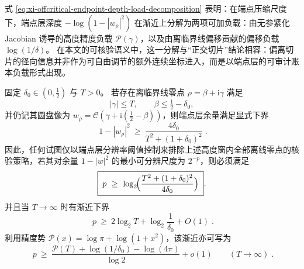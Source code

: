 \begin{remark}[端点深度的可加负载]\label{rem:xi-offcritical-endpoint-depth-additive-load}
式 \eqref{eq:xi-offcritical-endpoint-depth-load-decomposition} 表明：在端点压缩尺度下，端点层深度 \(-\log(1-|w_\rho|^2)\) 在渐近上分解为两项可加负载：由无参紧化 Jacobian 诱导的高度精度负载 \(\mathcal{P}(\gamma)\)，以及由离临界线偏移贡献的偏移负载 \(\log(1/\delta)\)。
在本文的可核验语义中，这一分解与“正交切片”结论相容：偏离切片的径向信息并非作为可自由调节的额外连续坐标进入，而是以端点层的可审计账本负载形式出现。
\end{remark}

\begin{theorem}\label{thm:xi-offcritical-endpoint-resolution-lower-bound}
固定 \(\delta_0\in(0,\tfrac12)\) 与 \(T>0\)。
若存在离临界线零点 \(\rho=\beta+\mathrm{i}\gamma\) 满足
\[
|\gamma|\le T,\qquad \beta\le \tfrac12-\delta_0,
\]
并仍记其圆盘像为 \(w_\rho=\mathcal{C}(\gamma+\mathrm{i}(\tfrac12-\beta))\)，则端点层余量满足显式下界
\begin{equation}\label{eq:xi-offcritical-endpoint-margin-min}
\boxed{\;
1-|w_\rho|^2\ \ge\ \frac{4\delta_0}{T^2+(1+\delta_0)^2}\; }.
\end{equation}
因此，任何试图仅以端点层分辨率阈值控制来排除上述高度窗内全部离线零点的核验策略，若其对余量 \(1-|w|^2\) 的最小可分辨尺度为 \(2^{-p}\)，则必须满足
\begin{equation}\label{eq:xi-offcritical-endpoint-bit-lower-bound}
\boxed{\;
p\ \ge\ \log_2\!\Bigl(\frac{T^2+(1+\delta_0)^2}{4\delta_0}\Bigr)\; }.
\end{equation}
并且当 \(T\to\infty\) 时有渐近下界
\begin{equation}\label{eq:xi-offcritical-endpoint-bit-asymptotic}
\boxed{\;
p\ \ge\ 2\log_2 T+\log_2\!\frac{1}{\delta_0}+O(1)\; }.
\end{equation}
利用精度势 \(\mathcal{P}(x)=\log\pi+\log(1+x^2)\)，该渐近亦可写为
\begin{equation}\label{eq:xi-offcritical-endpoint-bit-precision-potential-form}
\boxed{\;
p\ \ge\ \frac{\mathcal{P}(T)+\log(1/\delta_0)-\log(4\pi)}{\log 2}+o(1)\qquad(T\to\infty)\; }.
\end{equation}
\end{theorem}

